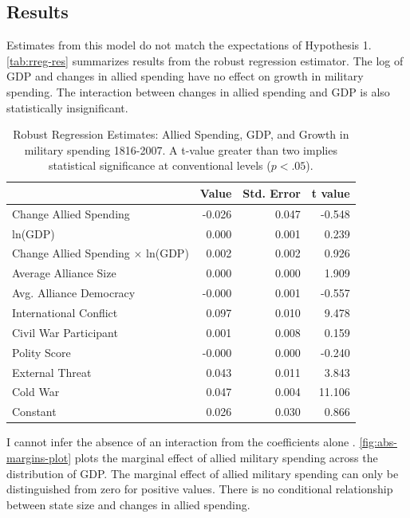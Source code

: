 \documentclass[12pt]{article}
\begin{document}
\subsection{Results}


Estimates from this model do not match the expectations of Hypothesis 1. 
\autoref{tab:rreg-res} summarizes results from the robust regression estimator. 
The log of GDP and changes in allied spending have no effect on growth in military spending. 
The interaction between changes in allied spending and GDP is also statistically insignificant. 


\begin{table}[ht]
\centering
\begin{tabular}{lrrr}
  \hline
 & Value & Std. Error & t value \\ 
  \hline
  Change Allied Spending & -0.026 & 0.047 & -0.548 \\ 
  ln(GDP) & 0.000 & 0.001 & 0.239 \\ 
	Change Allied Spending $\times$ ln(GDP) & 0.002 & 0.002 & 0.926 \\ 
  Average Alliance Size & 0.000 & 0.000 & 1.909 \\ 
  Avg. Alliance Democracy & -0.000 & 0.001 & -0.557 \\ 
  International Conflict & 0.097 & 0.010 & 9.478 \\ 
  Civil War Participant & 0.001 & 0.008 & 0.159 \\ 
  Polity Score & -0.000 & 0.000 & -0.240 \\ 
  External Threat & 0.043 & 0.011 & 3.843 \\ 
  Cold War & 0.047 & 0.004 & 11.106 \\ 
  Constant & 0.026 & 0.030 & 0.866 \\ 
   \hline
\end{tabular}
\caption{Robust Regression Estimates: Allied Spending, GDP, and Growth in military spending 1816-2007. A t-value greater than two implies statistical significance at conventional levels ($p < .05$).}
\label{tab:rreg-res}
\end{table}


I cannot infer the absence of an interaction from the coefficients alone \citep{BramborClarkGolder2006}. 
\autoref{fig:abs-margins-plot} plots the marginal effect of allied military spending across the distribution of GDP. 
The marginal effect of allied military spending can only be distinguished from zero for positive values. 
There is no conditional relationship between state size and changes in allied spending. 
\end{document}
